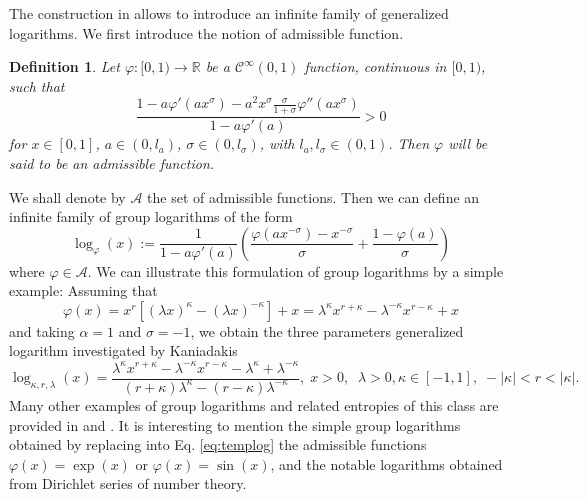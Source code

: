 \documentclass[10pt]{amsart}
\newcommand{\beq}{\begin{equation}}
\newcommand{\eeq}{\end{equation}}
\newcommand{\nn}{\nonumber}
\newtheorem{definition}{Definition}
\theoremstyle{definition}
\theoremstyle{definition}	 %
\begin{document}
The construction in \cite{tempesta2015} allows to introduce an infinite family of generalized logarithms. We first introduce the notion of admissible function.
\begin{definition}\label{admis}
Let $\varphi:[0,1)\to\mathbb{R}$ be a $\mathcal{C}^{\infty}(0,1)$ function, continuous in $[0,1)$, such that
\beq
\frac{1-a \varphi'(a x^{\sigma})-a^2  x^{\sigma} \frac{\sigma}{1+\sigma}  \varphi''(a x^{\sigma}) }{1-a \varphi'(a)}> 0 \label{ineq}
\eeq
for $x\in[0,1]$, $a\in (0,l_a)$, $\sigma\in (0,l_{\sigma})$, with $l_a,l_{\sigma}\in(0,1)$. Then $\varphi$ will be said to be an admissible function.
\end{definition}
We shall denote by $\mathcal{A}$ the set of admissible functions.
Then we can define an infinite family of group logarithms of the form
\beq \label{eq:templog}
\log_{\varphi}(x):=\frac{1}{1-a \varphi'(a)}\left(\frac{\varphi(ax^{-\sigma})-x^{-\sigma}}{\sigma}+\frac{1-\varphi(a)}{\sigma}\right)
\eeq
where $\varphi\in \mathcal{A}$.
We can illustrate this formulation of group logarithms by a simple example: Assuming that
%
\beq \nn
\varphi(x) = x^r \left[ (\lambda x)^{\kappa} - (\lambda x)^{-\kappa} \right] +x
= \lambda^{\kappa} x^{r+\kappa} -\lambda^{-\kappa} x^{r-\kappa} +x
\eeq
and taking $\alpha=1$ and $\sigma=-1$, we obtain the three parameters  generalized logarithm investigated by Kaniadakis  \cite{kaniadakis2009}
\beq
\displaystyle \log_{\kappa,r,\lambda} (x) = \frac{\lambda^{\kappa} x^{r+\kappa} - \lambda^{-\kappa} x^{r-\kappa} - \lambda^{\kappa} + \lambda^{-\kappa} }{(r+\kappa) \lambda^{\kappa} - (r-\kappa) \lambda^{-\kappa}}, \;  x>0, \;\; \lambda >0, \kappa \in [-1,1],  \; -|\kappa| < r < |\kappa|.
\eeq
Many other  examples of group logarithms and related entropies of this class are provided in \cite{tempesta2015} and \cite{Cichocki2025b}. It is interesting to mention the simple group logarithms obtained by replacing into Eq. \eqref{eq:templog} the admissible functions $\varphi(x)=\exp (x)$ or $\varphi(x)= \sin (x)$, and the notable logarithms obtained from Dirichlet series of number theory.

\vspace{3mm}
\end{document}

